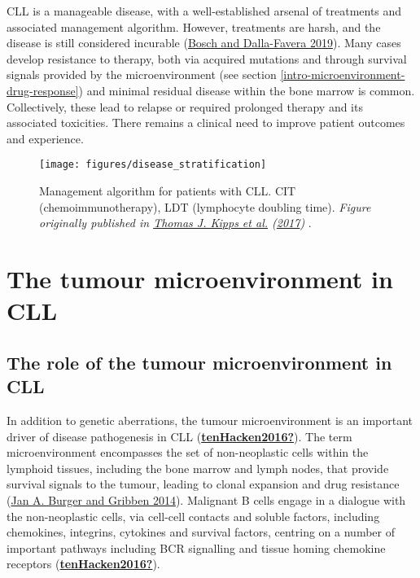 \documentclass[11pt, a4paper, twosided]{book}
\begin{document}
CLL is a manageable disease, with a well-established arsenal of treatments and associated management algorithm. However, treatments are harsh, and the disease is still considered incurable (\protect\hyperlink{ref-Bosch2019}{Bosch and Dalla-Favera 2019}). Many cases develop resistance to therapy, both via acquired mutations and through survival signals provided by the microenvironment (see section \ref{intro-microenvironment-drug-response}) and minimal residual disease within the bone marrow is common. Collectively, these lead to relapse or required prolonged therapy and its associated toxicities. There remains a clinical need to improve patient outcomes and experience.


\begin{figure}

{\centering \texttt{[image: figures/disease\_stratification]} 

}

\caption{Management algorithm for patients with CLL. CIT (chemoimmunotherapy), LDT (lymphocyte doubling time). \emph{Figure originally published in \protect\hyperlink{ref-Kipps2017}{Thomas J. Kipps et al.} (\protect\hyperlink{ref-Kipps2017}{2017}) }.}\label{fig:CLLstratification}
\end{figure}
\hypertarget{intro-tumour-microenvironment}{%
\section{The tumour microenvironment in CLL}\label{intro-tumour-microenvironment}}

\hypertarget{intro-tumour-microenvironment-role}{%
\subsection{The role of the tumour microenvironment in CLL}\label{intro-tumour-microenvironment-role}}

In addition to genetic aberrations, the tumour microenvironment is an important driver of disease pathogenesis in CLL (\protect\hyperlink{ref-tenHacken2016}{\textbf{tenHacken2016?}}). The term microenvironment encompasses the set of non-neoplastic cells within the lymphoid tissues, including the bone marrow and lymph nodes, that provide survival signals to the tumour, leading to clonal expansion and drug resistance (\protect\hyperlink{ref-Burger2014}{Jan A. Burger and Gribben 2014}). Malignant B cells engage in a dialogue with the non-neoplastic cells, via cell-cell contacts and soluble factors, including chemokines, integrins, cytokines and survival factors, centring on a number of important pathways including BCR signalling and tissue homing chemokine receptors (\protect\hyperlink{ref-tenHacken2016}{\textbf{tenHacken2016?}}).
\end{document}
